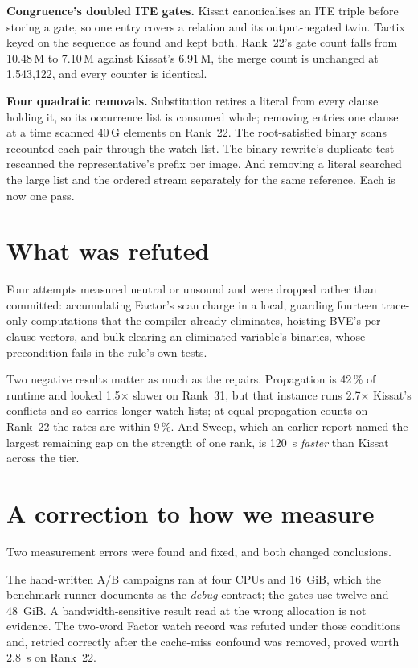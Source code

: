 \documentclass[11pt]{article}
\begin{document}
\textbf{Congruence's doubled ITE gates.} Kissat canonicalises an ITE triple
before storing a gate, so one entry covers a relation and its output-negated
twin. Tactix keyed on the sequence as found and kept both. Rank~22's gate count
falls from 10.48\,M to 7.10\,M against Kissat's 6.91\,M, the merge count is
unchanged at 1{,}543{,}122, and every counter is identical.

\textbf{Four quadratic removals.} Substitution retires a literal from every
clause holding it, so its occurrence list is consumed whole; removing entries
one clause at a time scanned 40\,G elements on Rank~22. The root-satisfied
binary scans recounted each pair through the watch list. The binary rewrite's
duplicate test rescanned the representative's prefix per image. And removing a
literal searched the large list and the ordered stream separately for the same
reference. Each is now one pass.

\section{What was refuted}

Four attempts measured neutral or unsound and were dropped rather than
committed: accumulating Factor's scan charge in a local, guarding fourteen
trace-only computations that the compiler already eliminates, hoisting BVE's
per-clause vectors, and bulk-clearing an eliminated variable's binaries, whose
precondition fails in the rule's own tests.

Two negative results matter as much as the repairs. Propagation is 42\,\% of
runtime and looked 1.5$\times$ slower on Rank~31, but that instance runs
2.7$\times$ Kissat's conflicts and so carries longer watch lists; at equal
propagation counts on Rank~22 the rates are within 9\,\%. And Sweep, which an
earlier report named the largest remaining gap on the strength of one rank, is
120~s \emph{faster} than Kissat across the tier.

\section{A correction to how we measure}

Two measurement errors were found and fixed, and both changed conclusions.

The hand-written A/B campaigns ran at four CPUs and 16~GiB, which the benchmark
runner documents as the \emph{debug} contract; the gates use twelve and 48~GiB.
A bandwidth-sensitive result read at the wrong allocation is not evidence. The
two-word Factor watch record was refuted under those conditions and, retried
correctly after the cache-miss confound was removed, proved worth 2.8~s on
Rank~22.
\end{document}
